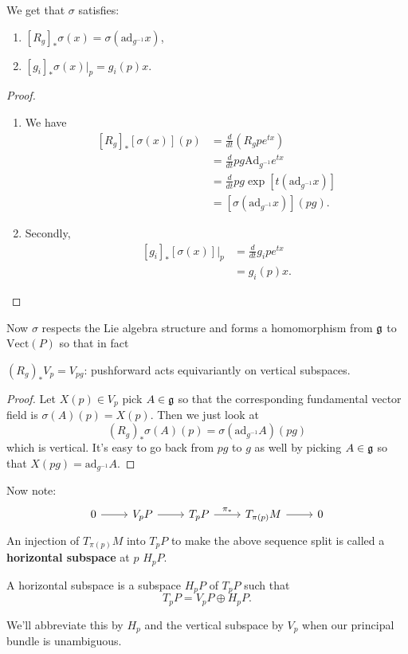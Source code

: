 		\begin{lemma}
			We get that $\sigma$ satisfies:
			\begin{enumerate}
				\item $[R_{g}]_* \sigma(x) = \sigma(\text{ad}_{g^{-1}} x)$,
				\item $[g_i]_* \sigma(x)|_p = g_i(p) x$.
			\end{enumerate}
		\end{lemma}
		\begin{proof}
			\begin{enumerate}
				\item We have
				\[
				\begin{aligned}
					\left[ R_{g} \right]_* [\sigma(x)](p)  &= \frac{d}{dt} (R_g p e^{tx}) \\
					& = \frac{d}{dt} p g \text{Ad}_{g^{-1}} e^{tx}\\ 
					& = \frac{d}{dt} p g \exp[ t (\text{ad}_{g^{-1}} x) ]\\
					& = [\sigma(\text{ad}_{g^{-1}} x)] (pg).
				\end{aligned}
				\]
				\item Secondly,
				\[
				\begin{aligned}
					\left[g_i\right]_* [\sigma(x)]|_p &= \frac{d}{dt} g_i p e^{t x}\\
										&= g_i(p) x.
				\end{aligned}	
				\]
			\end{enumerate}
		\end{proof}
	
		Now $\sigma$ respects the Lie algebra structure and forms a homomorphism from $\frak g$ to $\text{Vect}(P)$ so that in fact
		\begin{cor}\label{cor:verticalequiv}
			$(R_g)_* V_p = V_{pg}$: pushforward acts equivariantly on vertical subspaces.
		\end{cor}
		\begin{proof}
			Let $X(p) \in V_p$ pick $A \in \frak g$ so that the corresponding fundamental vector field is $\sigma(A) (p) = X(p)$. Then we just look at
			\[
				(R_g)_* \sigma(A) (p) = \sigma(\mathrm{ad}_{g^{-1}} A)(pg)
			\]
			which is vertical. It's easy to go back from $pg$ to $g$ as well by picking $A \in \frak g$ so that $X(pg) = \mathrm{ad}_{g^{-1}} A$.
		\end{proof}
	
		Now note:
		\[
		\begin{tikzcd}
			0 \arrow{r} & V_p P \arrow{r} & T_p P \arrow[r,"\pi_*"] & T_{\pi(p)}M \arrow{r} & 0
		\end{tikzcd}	
		\]
		An injection of $T_{\pi(p)} M$ into $T_p P$ to make the above sequence split is called a \textbf{horizontal subspace} at $p$ $H_pP$. 
		\begin{defn}
			A horizontal subspace is a subspace $H_p P$ of $T_p P$ such that
			\[
				T_p P = V_p P \oplus H_p P.
			\]
		\end{defn}
		We'll abbreviate this by $H_p$ and the vertical subspace by $V_p$ when our principal bundle is unambiguous.
	 
